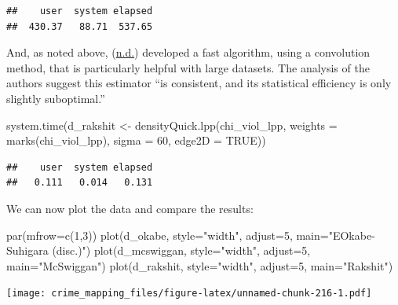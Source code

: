 \documentclass[
  krantz2]{krantz}
\makeatletter
\newenvironment{Shaded}{\begin{snugshade}}{\end{snugshade}}
\newcommand{\AttributeTok}[1]{\textcolor[rgb]{0.61,0.61,0.61}{#1}}
\newcommand{\ConstantTok}[1]{\textcolor[rgb]{0,0,0}{#1}}
\newcommand{\DecValTok}[1]{\textcolor[rgb]{0.06,0.06,0.06}{#1}}
\newcommand{\FunctionTok}[1]{\textcolor[rgb]{0,0,0}{#1}}
\newcommand{\NormalTok}[1]{#1}
\newcommand{\OtherTok}[1]{\textcolor[rgb]{0.37,0.37,0.37}{#1}}
\newcommand{\StringTok}[1]{\textcolor[rgb]{0.5,0.5,0.5}{#1}}
\newenvironment{kframe}{%
\medskip{}
\setlength{\fboxsep}{.8em}
 \def\at@end@of@kframe{}%
 \ifinner\ifhmode%
  \def\at@end@of@kframe{\end{minipage}}%
  \begin{minipage}{\columnwidth}%
 \fi\fi%
 \def\FrameCommand##1{\hskip\@totalleftmargin \hskip-\fboxsep
 \colorbox{shadecolor}{##1}\hskip-\fboxsep
     \hskip-\linewidth \hskip-\@totalleftmargin \hskip\columnwidth}%
 \MakeFramed {\advance\hsize-\width
   \@totalleftmargin\z@ \linewidth\hsize
   \@setminipage}}%
 {\par\unskip\endMakeFramed%
 \at@end@of@kframe}
\renewenvironment{Shaded}{\begin{kframe}}{\end{kframe}}
\makeatother
\begin{document}
\begin{verbatim}
##    user  system elapsed 
##  430.37   88.71  537.65
\end{verbatim}

And, as noted above, (\protect\hyperlink{ref-Rakshit_2019}{n.d.}) developed a fast algorithm, using a convolution method, that is particularly helpful with large datasets. The analysis of the authors suggest this estimator ``is consistent, and its statistical efficiency is only slightly suboptimal.''

\begin{Shaded}
\begin{Highlighting}[]
\FunctionTok{system.time}\NormalTok{(d\_rakshit }\OtherTok{\textless{}{-}} \FunctionTok{densityQuick.lpp}\NormalTok{(chi\_viol\_lpp, }
                                    \AttributeTok{weights =} \FunctionTok{marks}\NormalTok{(chi\_viol\_lpp), }
                                    \AttributeTok{sigma =} \DecValTok{60}\NormalTok{,}
                                    \AttributeTok{edge2D =} \ConstantTok{TRUE}\NormalTok{))}
\end{Highlighting}
\end{Shaded}

\begin{verbatim}
##    user  system elapsed 
##   0.111   0.014   0.131
\end{verbatim}

We can now plot the data and compare the results:

\begin{Shaded}
\begin{Highlighting}[]
\FunctionTok{par}\NormalTok{(}\AttributeTok{mfrow=}\FunctionTok{c}\NormalTok{(}\DecValTok{1}\NormalTok{,}\DecValTok{3}\NormalTok{))}
\FunctionTok{plot}\NormalTok{(d\_okabe, }\AttributeTok{style=}\StringTok{"width"}\NormalTok{, }\AttributeTok{adjust=}\DecValTok{5}\NormalTok{, }\AttributeTok{main=}\StringTok{"EOkabe{-}Suhigara (disc.)"}\NormalTok{)}
\FunctionTok{plot}\NormalTok{(d\_mcswiggan, }\AttributeTok{style=}\StringTok{"width"}\NormalTok{, }\AttributeTok{adjust=}\DecValTok{5}\NormalTok{, }\AttributeTok{main=}\StringTok{"McSwiggan"}\NormalTok{)}
\FunctionTok{plot}\NormalTok{(d\_rakshit, }\AttributeTok{style=}\StringTok{"width"}\NormalTok{, }\AttributeTok{adjust=}\DecValTok{5}\NormalTok{, }\AttributeTok{main=}\StringTok{"Rakshit"}\NormalTok{)}
\end{Highlighting}
\end{Shaded}

\texttt{[image: crime\_mapping\_files/figure-latex/unnamed-chunk-216-1.pdf]}
\end{document}

